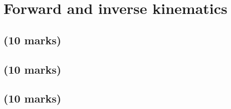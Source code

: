 \section{Forward and inverse kinematics}

\subsection{(10 marks)}


\subsection{(10 marks)}


\subsection{(10 marks)}

\newpage
